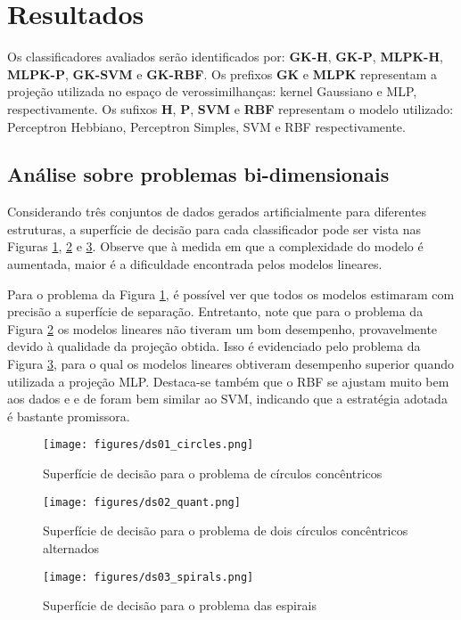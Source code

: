 \documentclass[conference]{IEEEtran}
\begin{document}
	\section{Resultados}
	Os classificadores avaliados serão identificados por: \textbf{GK-H}, \textbf{GK-P}, \textbf{MLPK-H}, \textbf{MLPK-P}, \textbf{GK-SVM} e \textbf{GK-RBF}. Os prefixos \textbf{GK} e \textbf{MLPK} representam a projeção utilizada no espaço de verossimilhanças: kernel Gaussiano e MLP, respectivamente. Os sufixos \textbf{H}, \textbf{P}, \textbf{SVM} e \textbf{RBF} representam o modelo utilizado: Perceptron Hebbiano, Perceptron Simples, SVM e RBF respectivamente.
	
	\subsection{Análise sobre problemas bi-dimensionais}
	Considerando três conjuntos de dados gerados artificialmente para diferentes estruturas, a superfície de decisão para cada classificador pode ser vista nas Figuras \ref{fig:ds01_circles}, \ref{fig:ds02_quant} e \ref{fig:ds03_spirals}. Observe que à medida em que a complexidade do modelo é aumentada, maior é a dificuldade encontrada pelos modelos lineares. 
	
	Para o problema da Figura \ref{fig:ds01_circles}, é possível ver que todos os modelos estimaram com precisão a superfície de separação. Entretanto, note que para o problema da Figura \ref{fig:ds02_quant} os modelos lineares não tiveram um bom desempenho, provavelmente devido à qualidade da projeção obtida. Isso é evidenciado pelo problema da Figura \ref{fig:ds03_spirals}, para o qual os modelos lineares obtiveram desempenho superior quando utilizada a projeção MLP. Destaca-se também que o RBF se ajustam muito bem aos dados e e de foram bem similar ao SVM, indicando que a estratégia adotada é bastante promissora.
	
	
	\begin{figure}[thpbh]
		\centering
		\texttt{[image: figures/ds01\_circles.png]}
		\caption{Superfície de decisão para o problema de círculos concêntricos}
		\label{fig:ds01_circles}
	\end{figure}
	\begin{figure}[thpbh]
		\centering
		\texttt{[image: figures/ds02\_quant.png]}
		\caption{Superfície de decisão para o problema de dois círculos concêntricos alternados}
		\label{fig:ds02_quant}
	\end{figure}
	\begin{figure}[thpbh]
		\centering
		\texttt{[image: figures/ds03\_spirals.png]}
		\caption{Superfície de decisão para o problema das espirais}
		\label{fig:ds03_spirals}
	\end{figure}
\end{document}
